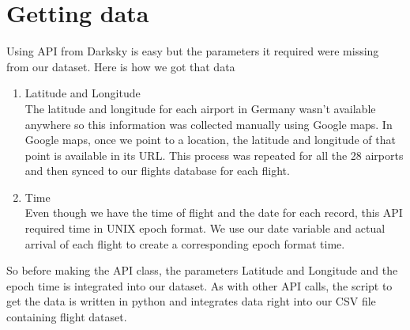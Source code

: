 \section{Getting data}
Using API from Darksky is easy but the parameters it required were missing from our dataset. Here is how we got that data
\begin{enumerate}
    \item Latitude and Longitude
    \\ The latitude and longitude for each airport in Germany wasn’t available anywhere so this information was collected manually using Google maps. In Google maps, once we point to a location, the latitude and longitude of that point is available in its URL. This process was repeated for all the 28 airports and then synced to our flights database for each flight.
    \item Time
    \\Even though we have the time of flight and the date for each record, this API required time in UNIX epoch format. We use our date variable and actual arrival of each flight to create a corresponding epoch format time.
\end{enumerate}
So before making the API class, the parameters Latitude and Longitude and the epoch time is integrated into our dataset. 
As with other API calls, the script to get the data is written in python and integrates data right into our CSV file containing flight dataset. 


